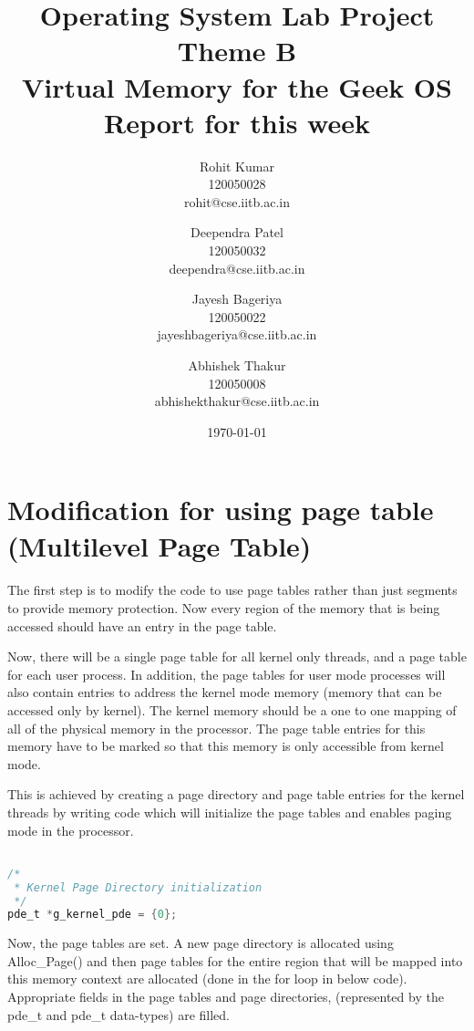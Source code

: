 \documentclass[11pt]{article}
\title{\textbf{Operating System Lab Project \\ 
	Theme B \\
    Virtual Memory for the Geek OS \\
    Report for this week
	 }}
\author{Rohit Kumar \\ 120050028 \\ rohit@cse.iitb.ac.in
		\and 
		Deependra Patel \\ 120050032 \\ deependra@cse.iitb.ac.in
		\and
		Jayesh Bageriya \\ 120050022 \\ jayeshbageriya@cse.iitb.ac.in
        \\
		\and 
		Abhishek Thakur \\ 120050008 \\ abhishekthakur@cse.iitb.ac.in
		}
\date{\today}
\begin{document}
\maketitle



\section{Modification for using page table (Multilevel Page Table)}
\paragraph{}

The first step is to modify the code to use page tables rather than just segments to
provide memory protection. Now every region of the memory that is being accessed should have an entry in the page table.

Now, there will be a single page table for all kernel only threads, and a page table for each user process. In addition, the page tables for user mode processes will also contain entries to address the kernel mode memory (memory that can be accessed only by kernel). The kernel memory should be a one to one mapping of all of the physical memory in the processor. The page
table entries for this memory have to be marked so that this memory is only accessible from kernel mode.

This is achieved by creating a page directory and page table entries for the kernel threads by writing code which will 
initialize the page tables and enables paging mode in the processor.

\begin{lstlisting}[language=c]

/*
 * Kernel Page Directory initialization
 */
pde_t *g_kernel_pde = {0};

\end{lstlisting}


Now, the page tables are set. A new page directory is allocated using Alloc\_Page() and then
page tables for the entire region that will be mapped into this memory context are allocated (done in the for loop in below code). Appropriate fields in the page tables and page directories, (represented by the pde\_t and pde\_t data-types) are filled.

\newpage
\end{document}
